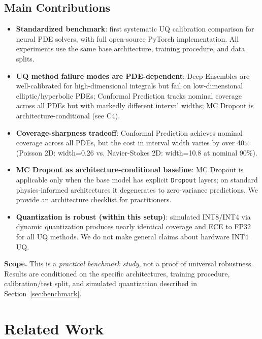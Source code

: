 \documentclass[12pt,a4paper]{article}
\theoremstyle{plain}
\begin{document}
\subsection{Main Contributions}

\begin{itemize}
    \item[C1] \textbf{Standardized benchmark}: first systematic UQ calibration
        comparison for neural PDE solvers, with full open-source PyTorch
        implementation.  All experiments use the same base architecture,
        training procedure, and data splits.
    \item[C2] \textbf{UQ method failure modes are PDE-dependent}:
        Deep Ensembles are well-calibrated for high-dimensional integrals
        but fail on low-dimensional elliptic/hyperbolic PDEs;
        Conformal Prediction tracks nominal coverage across all PDEs
        but with markedly different interval widths; MC Dropout is
        architecture-conditional (see C4).
    \item[C3] \textbf{Coverage-sharpness tradeoff}: Conformal Prediction
        achieves nominal coverage across all PDEs, but the cost in interval
        width varies by over 40$\times$ (Poisson 2D: width=0.26 vs.
        Navier-Stokes 2D: width=10.8 at nominal 90\%).
    \item[C4] \textbf{MC Dropout as architecture-conditional baseline}:
        MC Dropout is applicable only when the base model has explicit
        \texttt{Dropout} layers; on standard physics-informed architectures
        it degenerates to zero-variance predictions.  We provide an
        architecture checklist for practitioners.
    \item[C5] \textbf{Quantization is robust (within this setup)}:
        simulated INT8/INT4 via dynamic quantization produces nearly
        identical coverage and ECE to FP32 for all UQ methods.
        We do not make general claims about hardware INT4 UQ.
\end{itemize}

\textbf{Scope.}  This is a \emph{practical benchmark study}, not a proof of
universal robustness.  Results are conditioned on the specific architectures,
training procedure, calibration/test split, and simulated quantization
described in Section~\ref{sec:benchmark}.

\section{Related Work}
\label{sec:related}
\end{document}
